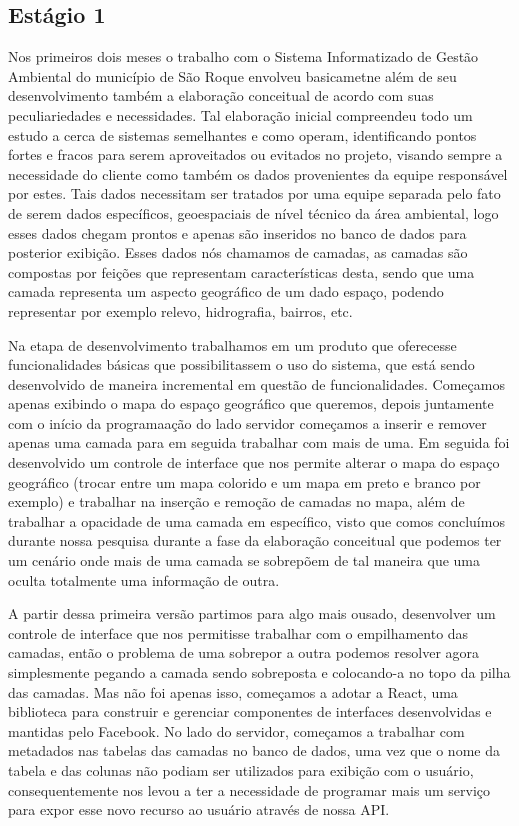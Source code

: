 \documentclass{ufscar}
\begin{document}
\subsection{Estágio 1}
Nos primeiros dois meses o trabalho com o Sistema Informatizado de Gestão Ambiental do município de São Roque envolveu basicametne além de seu desenvolvimento também a elaboração conceitual de acordo com suas peculiariedades e necessidades. Tal elaboração inicial compreendeu todo um estudo a cerca de sistemas semelhantes e como operam, identificando pontos fortes e fracos para serem aproveitados ou evitados no projeto, visando sempre a necessidade do cliente como também os dados provenientes da equipe responsável por estes. Tais dados necessitam ser tratados por uma equipe separada pelo fato de serem dados específicos, geoespaciais de nível técnico da área ambiental, logo esses dados chegam prontos e apenas são inseridos no banco de dados para posterior exibição. Esses dados nós chamamos de camadas, as camadas são compostas por feições que representam características desta, sendo que uma camada representa um aspecto geográfico de um dado espaço, podendo representar por exemplo relevo, hidrografia, bairros, etc.

Na etapa de desenvolvimento trabalhamos em um produto que oferecesse funcionalidades básicas que possibilitassem o uso do sistema, que está sendo desenvolvido de maneira incremental em questão de funcionalidades. Começamos apenas exibindo o mapa do espaço geográfico
que queremos, depois juntamente com o início da programaação do lado servidor começamos a inserir e remover apenas uma camada para em seguida trabalhar com mais de uma. Em seguida foi desenvolvido um controle de interface que nos permite alterar o mapa do espaço geográfico (trocar entre um mapa colorido e um mapa em preto e branco por exemplo) e trabalhar na inserção e remoção de camadas no mapa, além de trabalhar a opacidade de uma camada em específico, visto que comos concluímos durante nossa pesquisa durante a fase da elaboração conceitual que podemos ter um cenário onde mais de uma camada se sobrepõem de tal maneira que uma oculta totalmente uma informação de outra.

A partir dessa primeira versão partimos para algo mais ousado, desenvolver um controle de interface que nos permitisse trabalhar com o empilhamento das camadas, então o problema de uma sobrepor a outra podemos resolver agora simplesmente pegando a camada sendo sobreposta e colocando-a no topo da pilha das camadas. Mas não foi apenas isso, começamos a adotar a React, uma biblioteca para construir e gerenciar componentes de interfaces desenvolvidas e mantidas pelo Facebook. No lado do servidor, começamos a trabalhar com metadados nas tabelas das camadas no banco de dados, uma vez que o nome da tabela e das colunas não podiam ser utilizados para exibição com o usuário, consequentemente nos levou a ter a necessidade de programar mais um serviço para expor esse novo recurso ao usuário através de nossa API.
\end{document}
